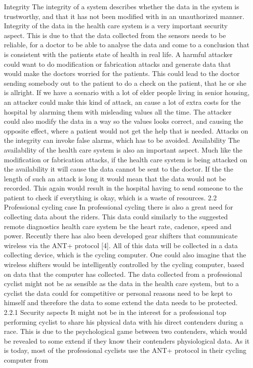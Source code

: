 Integrity The integrity of a system describes whether the data in the system is trustworthy, and that it has not been modified with in an unauthorized manner. Integrity of the data in the health care system is a very important security aspect. This is due to that the data collected from the sensors needs to be reliable, for a doctor to be able to analyse the data and come to a conclusion that is consistent with the patients state of health in real life.
A harmful attacker could want to do modification or fabrication attacks and generate data that would make the doctors worried for the patients. This could lead to the doctor sending somebody out to the patient to do a check on the patient, that he or she is allright. If we have a scenario with a lot of elder people living in senior housing, an attacker could make this kind of attack, an cause a lot of extra costs for the hospital by alarming them with misleading values all the time. The attacker could also modify the data in a way so the values looks correct, and causing the opposite effect, where a patient would not get the help that is needed.
Attacks on the integrity can invoke false alarms, which has to be avoided.
Availability The availability of the health care system is also an important aspect. Much like the modification or fabrication attacks, if the health care system is being attacked on the availability it will cause the data cannot be sent to the doctor. If the the length of such an attack is long it would mean that the data would not be recorded. This again would result in the hospital having to send someone to the patient to check if everything is okay, which is a waste of resources.
2.2 Professional cycling case
In professional cycling there is also a great need for collecting data about the riders. This data could similarly to the suggested remote diagnostics health care system be the heart rate, cadence, speed and power. Recently there has also been developed gear shifters that communicate wireless via the ANT+ protocol [4]. All of this data will be collected in a data collecting device, which is the cycling computer. One could also imagine that the wireless shifters would be intelligently controlled by the cycling computer, based on data that the computer has collected. The data collected from a professional cyclist might not be as sensible as the data in the health care system, but to a cyclist the data could for competitive or personal reasons need to be kept to himself and therefore the data to some extend the data needs to be protected.
2.2.1 Security aspects
It might not be in the interest for a professional top performing cyclist to share his physical data with his direct contenders during a race. This is due to the psychological game between two contenders, which would be revealed to some extend if they know their contenders physiological data. As it is today, most of the professional cyclists use the ANT+ protocol in their cycling computer from
